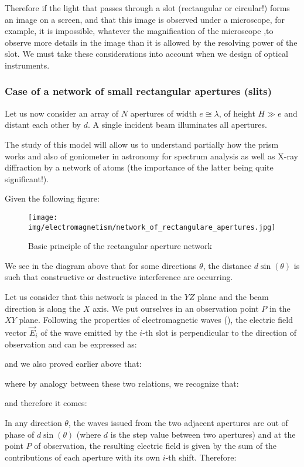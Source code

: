 	Therefore if the light that passes through a slot (rectangular or circular!) forms an image on a screen, and that this image is observed under a microscope, for example, it is impossible, whatever the magnification of the microscope ,to observe more details in the image than it is allowed by the resolving power of the slot. We must take these considerations into account when we design of optical instruments.
	
	\subsubsection{Case of a network of small rectangular apertures (slits)}
	Let us now consider an array of $N$ apertures of width $e\cong \lambda$, of height $H \gg e$ and distant each other by $d$. A single incident beam illuminates all apertures.
	\begin{tcolorbox}[title=Remark,colframe=black,arc=10pt]
	The study of this model will allow us to understand partially how the prism works and also of goniometer in astronomy for spectrum analysis as well as X-ray diffraction by a network of atoms (the importance of the latter being quite significant!).
	\end{tcolorbox}
	Given the following figure:
	\begin{figure}[H]
		\centering
		\texttt{[image: img/electromagnetism/network\_of\_rectangulare\_apertures.jpg]}
		\caption{Basic principle of the rectangular aperture network}
	\end{figure}
	We see in the diagram above that for some directions $\theta$, the distance $d\sin(\theta)$ is such that constructive or destructive interference are occurring.
	
	Let us consider that this network is placed in the $YZ$ plane and the beam direction is along the $X$ axis. We put ourselves in an observation point $P$ in the $XY$ plane. Following the properties of electromagnetic waves (), the electric field vector $\vec{E}_i$ of the wave emitted by the $i$-th slot is perpendicular to the direction of observation and can be expressed as:
	
	and we also proved earlier above that:
	
	where by analogy between these two relations, we recognize that:
	
	and therefore it comes:
	
	In any direction $\theta$, the waves issued from the two adjacent apertures are out of phase of $d\sin(\theta)$ (where $d$ is the step value between two apertures) and at the point $P$ of observation, the resulting electric field is given by the sum of the contributions of each aperture with its own $i$-th shift. Therefore:
	
